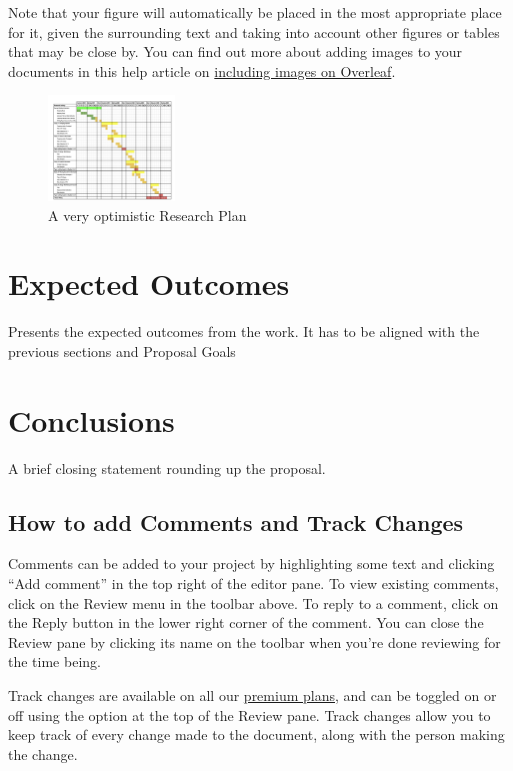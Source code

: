 \documentclass{article}
\begin{document}
Note that your figure will automatically be placed in the most appropriate place for it, given the surrounding text and taking into account other figures or tables that may be close by. You can find out more about adding images to your documents in this help article on \href{https://www.overleaf.com/learn/how-to/Including_images_on_Overleaf}{including images on Overleaf}.

\begin{figure}[htb]
\centering
\includegraphics[width=0.3\textwidth]{Gantt Chart.png}
\caption{\label{fig:research plan}A very optimistic Research Plan}
\end{figure}

\section{Expected Outcomes}
Presents the expected outcomes from the work. It has to be aligned with the previous sections and Proposal Goals

\section{Conclusions}
A brief closing statement rounding up the proposal.

\subsection{How to add Comments and Track Changes}

Comments can be added to your project by highlighting some text and clicking ``Add comment'' in the top right of the editor pane. To view existing comments, click on the Review menu in the toolbar above. To reply to a comment, click on the Reply button in the lower right corner of the comment. You can close the Review pane by clicking its name on the toolbar when you're done reviewing for the time being.

Track changes are available on all our \href{https://www.overleaf.com/user/subscription/plans}{premium plans}, and can be toggled on or off using the option at the top of the Review pane. Track changes allow you to keep track of every change made to the document, along with the person making the change. 



\end{document}
